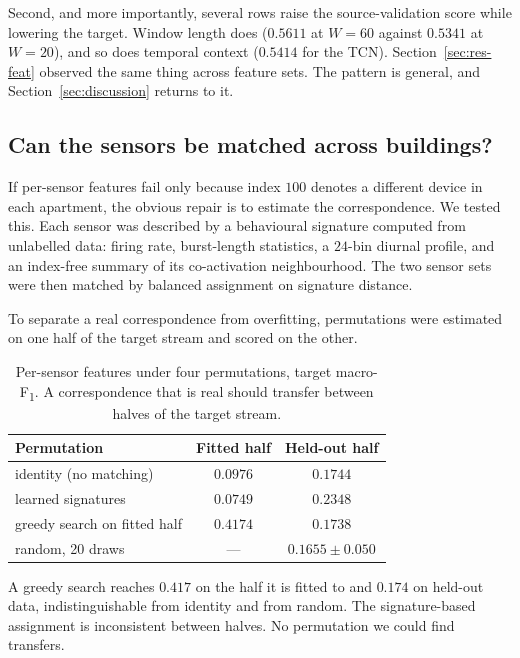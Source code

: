 \documentclass[a4paper,fleqn]{cas-dc}
\newcommand{\macf}{macro-F\textsubscript{1}}
\begin{document}
Second, and more importantly, several rows raise the source-validation score while
lowering the target. Window length does ($0.5611$ at $W{=}60$ against $0.5341$ at
$W{=}20$), and so does temporal context ($0.5414$ for the TCN). Section~\ref{sec:res-feat}
observed the same thing across feature sets. The pattern is general, and
Section~\ref{sec:discussion} returns to it.

\subsection{Can the sensors be matched across buildings?}
\label{sec:res-corr}

If per-sensor features fail only because index $100$ denotes a different device in each
apartment, the obvious repair is to estimate the correspondence. We tested this. Each
sensor was described by a behavioural signature computed from unlabelled data: firing
rate, burst-length statistics, a $24$-bin diurnal profile, and an index-free summary of
its co-activation neighbourhood. The two sensor sets were then matched by balanced
assignment on signature distance.

To separate a real correspondence from overfitting, permutations were estimated on one
half of the target stream and scored on the other.

\begin{table}[t]
\centering
\caption{Per-sensor features under four permutations, target \macf. A correspondence that
is real should transfer between halves of the target stream.}
\label{tab:corr}
\small
\begin{tabular}{lcc}
\toprule
Permutation & Fitted half & Held-out half \\
\midrule
identity (no matching)      & $0.0976$ & $0.1744$ \\
learned signatures          & $0.0749$ & $0.2348$ \\
greedy search on fitted half& $\mathbf{0.4174}$ & $0.1738$ \\
random, 20 draws            & --- & $0.1655\pm0.050$ \\
\bottomrule
\end{tabular}
\end{table}

A greedy search reaches $0.417$ on the half it is fitted to and $0.174$ on held-out data,
indistinguishable from identity and from random. The signature-based assignment is
inconsistent between halves. No permutation we could find transfers.
\end{document}
